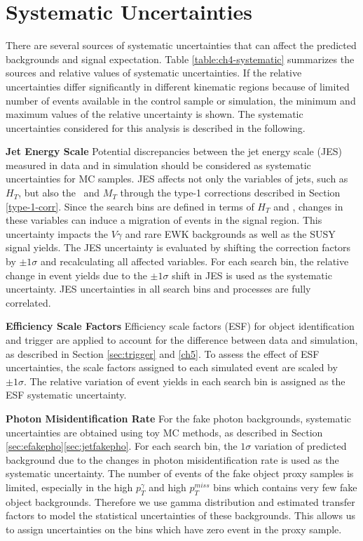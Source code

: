 \documentclass[thesis.tex]{subfiles}
\renewcommand\_{\textunderscore\allowbreak}
\begin{document}
\section{Systematic Uncertainties}
There are several sources of systematic uncertainties that can affect the predicted backgrounds and signal expectation.
Table \ref{table:ch4-systematic} summarizes the sources and relative values of systematic uncertainties.
If the relative uncertainties differ significantly in different kinematic regions because of limited number of events available in the control sample or simulation, the minimum and maximum values of the relative uncertainty is shown.
The systematic uncertainties considered for this analysis is described in the following. 

\noindent \textbf{Jet Energy Scale} 
\quad Potential discrepancies between the jet energy scale (JES) measured in data and in simulation should be considered as systematic uncertainties for MC samples. 
JES affects not only the variables of jets, such as $H_T$, but also the \MET~and $M_T$ through the type-1 corrections described in Section \ref{type-1-corr}.
Since the search bins are defined in terms of $H_T$ and \MET, changes in these variables can induce a migration of events in the signal region. 
This uncertainty impacts the $V\gamma$ and rare EWK backgrounds as well as the SUSY signal yields. 
The JES uncertainty is evaluated by shifting the correction factors by $\pm 1 \sigma$ and recalculating all affected variables. 
For each search bin, the relative change in event yields due to the $\pm 1 \sigma$ shift in JES is used as the systematic uncertainty.
JES uncertainties in all search bins and processes are fully correlated. 

\noindent \textbf{Efficiency Scale Factors}
\quad Efficiency scale factors (ESF) for object identification and trigger are applied to account for the difference between data and simulation, as described in Section \ref{sec:trigger} and \ref{ch5}. 
To assess the effect of ESF uncertainties, the scale factors assigned to each simulated event are scaled by $\pm 1 \sigma$. 
The relative variation of event yields in each search bin is assigned as the ESF systematic uncertainty. 

\noindent \textbf{Photon Misidentification Rate} 
\quad For the fake photon backgrounds, systematic uncertainties are obtained using toy MC methods, as described in Section \ref{sec:efakepho}\ref{sec:jetfakepho}. 
For each search bin, the $1 \sigma$ variation of predicted background due to the changes in photon misidentification rate is used as the systematic uncertainty. 
The number of events of the fake object proxy samples is limited, especially in the high $p_T^{\gamma}$ and high $p_T^{miss}$ bins which contains very few fake object backgrounds. 
Therefore we use gamma distribution and estimated transfer factors to model the statistical uncertainties of these backgrounds. This allows us to assign uncertainties on the bins which have zero event in the proxy sample. 
\end{document}
